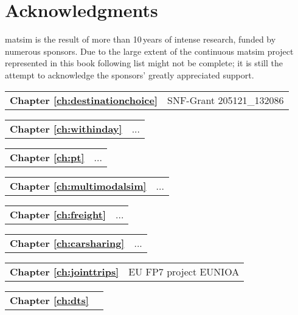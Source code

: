 \chapter*{Acknowledgments}
\gls{matsim} is the result of more than 10\,years of intense research, funded by numerous sponsors. Due to the large extent of the continuous \gls{matsim} project represented in this book following list might not be complete; it is still the attempt to acknowledge the sponsors' greatly appreciated support. 

\begin{tabular}[width=0.48\textwidth]{@{}l l}
\textbf{Chapter \ref{ch:destinationchoice}} & SNF-Grant 205121\_132086  \\
\end{tabular}

\begin{tabular}[width=0.48\textwidth]{@{}l l}
\textbf{Chapter \ref{ch:withinday}} & ... \\
\end{tabular}

\begin{tabular}[width=0.48\textwidth]{@{}l l}
\textbf{Chapter \ref{ch:pt}} & ... \\
\end{tabular}

\begin{tabular}[width=0.48\textwidth]{@{}l l}
\textbf{Chapter \ref{ch:multimodalsim}} & ... \\
\end{tabular}

\begin{tabular}[width=0.48\textwidth]{@{}l l}
\textbf{Chapter \ref{ch:freight}} & ... \\
\end{tabular}

\begin{tabular}[width=0.48\textwidth]{@{}l l}
\textbf{Chapter \ref{ch:carsharing}} & ... \\
\end{tabular}

\begin{tabular}[width=0.48\textwidth]{@{}l l}
\textbf{Chapter \ref{ch:jointtrips}} & EU FP7 project EUNIOA \\
\end{tabular}

\begin{tabular}[width=0.48\textwidth]{@{}l l}
\textbf{Chapter \ref{ch:dts}} &  \\
\end{tabular}

